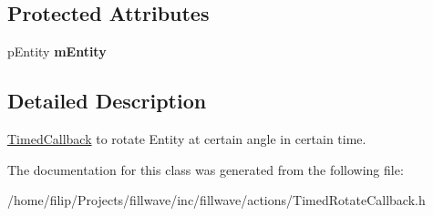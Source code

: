 \subsection*{Protected Attributes}
\begin{DoxyCompactItemize}
\item 
\hypertarget{classfillwave_1_1actions_1_1TimedRotateCallback_a4d2ce261bc9992838900d05490d09963}{}p\+Entity {\bfseries m\+Entity}\label{classfillwave_1_1actions_1_1TimedRotateCallback_a4d2ce261bc9992838900d05490d09963}

\end{DoxyCompactItemize}


\subsection{Detailed Description}
\hyperlink{classfillwave_1_1actions_1_1TimedCallback}{Timed\+Callback} to rotate Entity at certain angle in certain time. 

The documentation for this class was generated from the following file\+:\begin{DoxyCompactItemize}
\item 
/home/filip/\+Projects/fillwave/inc/fillwave/actions/Timed\+Rotate\+Callback.\+h\end{DoxyCompactItemize}
